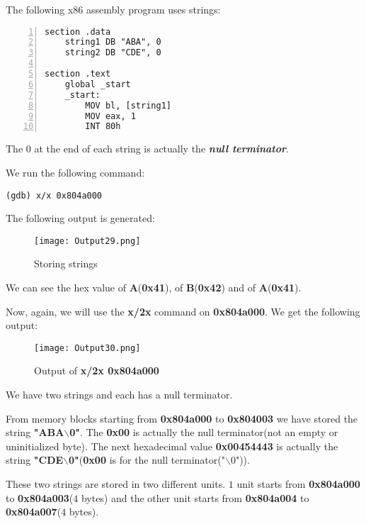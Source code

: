 \documentclass{article}
\makeatletter
\renewcommand\paragraph{\@startsection{paragraph}{4}{\z@}{-3.25ex \@plus -1ex \@minus -.2ex}{1.5ex \@plus .2ex}{\normalfont\normalsize\bfseries}}
\makeatother
\begin{document}
\paragraph{}
The following x86 assembly program uses strings:

\begin{Verbatim}[numbers=left, frame=single]
section .data
	string1 DB "ABA", 0
	string2 DB "CDE", 0
	
section .text
	global _start
	_start:
		MOV bl, [string1]
		MOV eax, 1
		INT 80h
\end{Verbatim}
The $0$ at the end of each string is actually the \textbf{\textit{null terminator}}.

We run the following command:
\begin{Verbatim}[frame=single]
(gdb) x/x 0x804a000
\end{Verbatim}

The following output is generated:
\begin{figure}[h]
\centering
\texttt{[image: Output29.png]}
\caption{Storing strings}
\label{fig:storeStrings}
\end{figure}

We can see the hex value of \textbf{A}(\textbf{0x41}), of \textbf{B}(\textbf{0x42}) and of \textbf{A}(\textbf{0x41}).

Now, again, we will use the \textbf{x/2x} command on \textbf{0x804a000}. We get the following output:

\begin{figure}[h]
\centering
\texttt{[image: Output30.png]}
\caption{Output of \textbf{x/2x 0x804a000}}
\label{fig:x/2x}
\end{figure}

We have two strings and each has a null terminator.

From memory blocks starting from \textbf{0x804a000} to \textbf{0x804003} we have stored the string \textbf{"ABA$\backslash$0"}. The \textbf{0x00} is actually the null terminator(not an empty or uninitialized byte). The next hexadecimal value \textbf{0x00454443} is actually the string \textbf{"CDE$\backslash$0"}(\textbf{0x00} is for the null terminator("$\backslash$0")).

\newpage
These two strings are stored in two different units. $1$ unit starts from \textbf{0x804a000} to \textbf{0x804a003}($4$ bytes) and the other unit starts from \textbf{0x804a004} to \textbf{0x804a007}($4$ bytes).
\end{document}
